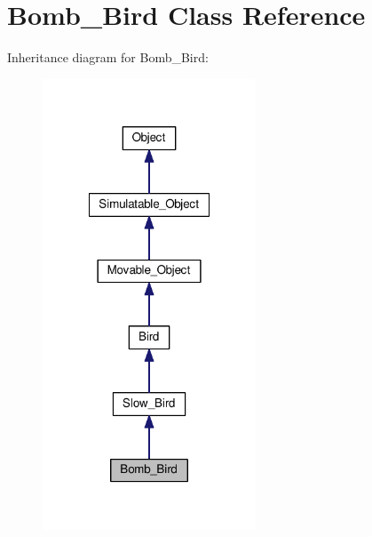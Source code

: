 \hypertarget{classBomb__Bird}{\section{Bomb\+\_\+\+Bird Class Reference}
\label{classBomb__Bird}
}


Inheritance diagram for Bomb\+\_\+\+Bird\+:\nopagebreak
\begin{figure}[H]
\begin{center}
\leavevmode
\includegraphics[width=180pt]{classBomb__Bird__inherit__graph}
\end{center}
\end{figure}


